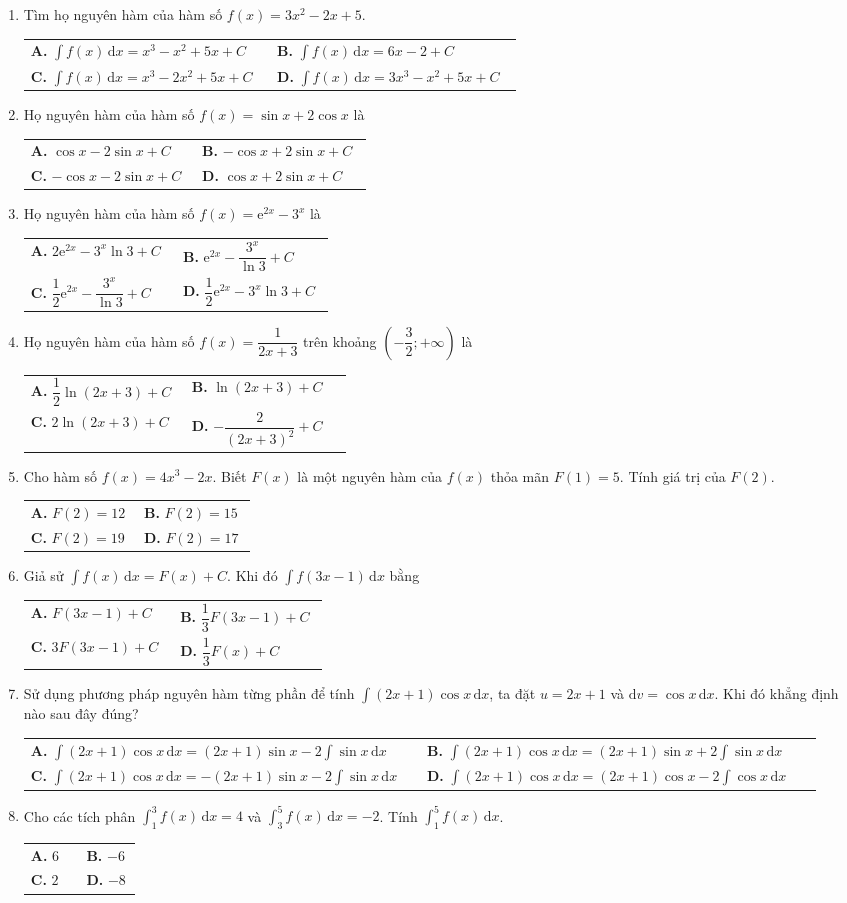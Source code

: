 \documentclass[12pt,a4paper]{article}
\makeatletter
\newcommand{\bonpa}[4]{\par\nobreak\smallskip\nobreak\noindent
\begin{tabular}{@{}p{0.48\linewidth}p{0.48\linewidth}@{}}
\textbf{A.} #1 & \textbf{B.} #2\\[7pt]
\textbf{C.} #3 & \textbf{D.} #4\end{tabular}}
\makeatother
\begin{document}
\begin{enumerate}[start=16]
\item Tìm họ nguyên hàm của hàm số $f(x) = 3x^2 - 2x + 5$.
\bonpa{$\int f(x)\,\mathrm{d}x = x^3 - x^2 + 5x + C$}{$\int f(x)\,\mathrm{d}x = 6x - 2 + C$}{$\int f(x)\,\mathrm{d}x = x^3 - 2x^2 + 5x + C$}{$\int f(x)\,\mathrm{d}x = 3x^3 - x^2 + 5x + C$}

\item Họ nguyên hàm của hàm số $f(x) = \sin x + 2\cos x$ là
\bonpa{$\cos x - 2\sin x + C$}{$-\cos x + 2\sin x + C$}{$-\cos x - 2\sin x + C$}{$\cos x + 2\sin x + C$}

\item Họ nguyên hàm của hàm số $f(x) = \mathrm{e}^{2x} - 3^x$ là
\bonpa{$2\mathrm{e}^{2x} - 3^x\ln 3 + C$}{$\mathrm{e}^{2x} - \dfrac{3^x}{\ln 3} + C$}{$\dfrac{1}{2}\mathrm{e}^{2x} - \dfrac{3^x}{\ln 3} + C$}{$\dfrac{1}{2}\mathrm{e}^{2x} - 3^x\ln 3 + C$}

\item Họ nguyên hàm của hàm số $f(x) = \dfrac{1}{2x+3}$ trên khoảng $\left(-\dfrac{3}{2}; +\infty\right)$ là
\bonpa{$\dfrac{1}{2}\ln(2x+3) + C$}{$\ln(2x+3) + C$}{$2\ln(2x+3) + C$}{$-\dfrac{2}{(2x+3)^2} + C$}

\item Cho hàm số $f(x) = 4x^3 - 2x$. Biết $F(x)$ là một nguyên hàm của $f(x)$ thỏa mãn $F(1) = 5$. Tính giá trị của $F(2)$.
\bonpa{$F(2) = 12$}{$F(2) = 15$}{$F(2) = 19$}{$F(2) = 17$}

\item Giả sử $\int f(x)\,\mathrm{d}x = F(x) + C$. Khi đó $\int f(3x-1)\,\mathrm{d}x$ bằng
\bonpa{$F(3x-1) + C$}{$\dfrac{1}{3}F(3x-1) + C$}{$3F(3x-1) + C$}{$\dfrac{1}{3}F(x) + C$}

\item Sử dụng phương pháp nguyên hàm từng phần để tính $\int (2x+1)\cos x\,\mathrm{d}x$, ta đặt $u = 2x+1$ và $\mathrm{d}v = \cos x\,\mathrm{d}x$. Khi đó khẳng định nào sau đây đúng?
\bonpa{$\int (2x+1)\cos x\,\mathrm{d}x = (2x+1)\sin x - 2\int \sin x\,\mathrm{d}x$}{$\int (2x+1)\cos x\,\mathrm{d}x = (2x+1)\sin x + 2\int \sin x\,\mathrm{d}x$}{$\int (2x+1)\cos x\,\mathrm{d}x = -(2x+1)\sin x - 2\int \sin x\,\mathrm{d}x$}{$\int (2x+1)\cos x\,\mathrm{d}x = (2x+1)\cos x - 2\int \cos x\,\mathrm{d}x$}

\item Cho các tích phân $\int_1^3 f(x)\,\mathrm{d}x = 4$ và $\int_3^5 f(x)\,\mathrm{d}x = -2$. Tính $\int_1^5 f(x)\,\mathrm{d}x$.
\bonpa{$6$}{$-6$}{$2$}{$-8$}


\end{enumerate}
\end{document}
